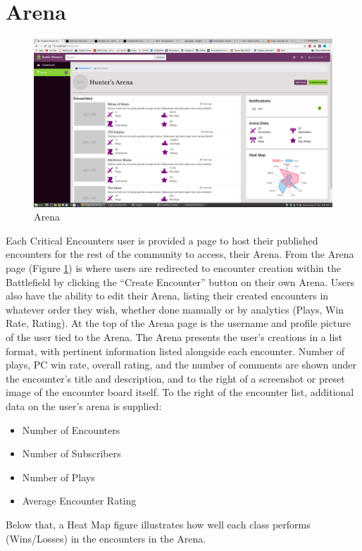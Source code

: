 \documentclass[12pt,a4paper]{report}
\begin{document}
	\section{Arena}
	\begin{figure}[!h]
		\centering
		\includegraphics[scale=.20]{arena}
		\caption{Arena}
		\label{fig: Arena}
	\end{figure}
	Each Critical Encounters user is provided a page to host their published encounters for the rest of the community to access, their Arena. From the Arena page (Figure \ref{fig: Arena}) is where users are redirected to encounter creation within the Battlefield by clicking the ``Create Encounter'' button on their own Arena. Users also have the ability to edit their Arena, listing their created encounters in whatever order they wish, whether done manually or by analytics (Plays, Win Rate, Rating). At the top of the Arena page is the username and profile picture of the user tied to the Arena. The Arena presents the user's creations in a list format, with pertinent information listed alongside each encounter. Number of plays, PC win rate, overall rating, and the number of comments are shown under the encounter's title and description, and to the right of a screenshot or preset image of the encounter board itself. To the right of the encounter list, additional data on the user's arena is supplied: 
	\begin{multicols}{2}
		\begin{itemize}
			\item Number of Encounters
			\item Number of Subscribers
			\item Number of Plays
			\item Average Encounter Rating
		\end{itemize}
	\end{multicols}
	Below that, a Heat Map figure illustrates how well each class performs (Wins/Losses) in the encounters in the Arena.
	\newpage
\end{document}
